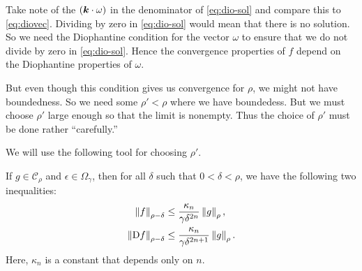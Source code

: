 \documentclass[twoside,letterpaper,10pt]{article}
\numberwithin{equation}{section}
\begin{document}
Take note of the $(\bm{k} \cdot \omega)$ in the denominator of \cref{eq:dio-sol}
and compare this to \cref{eq:diovec}.
Dividing by zero in \cref{eq:dio-sol} would mean that there is no solution.
So we need the Diophantine condition for the vector $\omega$ to ensure that we
do not divide by zero in \cref{eq:dio-sol}.
Hence the convergence properties of $f$ depend on the Diophantine properties of
$\omega$.

But even though this condition gives us convergence for $\rho$, we might not
have boundedness.
So we need some $\rho' < \rho$ where we have boundedess.
But we must choose $\rho'$ large enough so that the limit is nonempty.
Thus the choice of $\rho'$ must be done rather ``carefully.''

We will use the following tool for choosing $\rho'$.
\begin{prop}
  If $g \in \mathcal{C}_{\rho}$ and $\epsilon \in \Omega_{\gamma}$, then for all
  $\delta$ such that $0 < \delta < \rho$, we have the following two
  inequalities:
  \begin{align*}
    \norm{f}_{\rho - \delta} &\leq \frac{\kappa_n}{\gamma
                               \delta^{2n}}\norm{g}_{\rho},\\
    \norm{\Dif f}_{\rho - \delta} &\leq \frac{\kappa_n}{\gamma \delta^{2n + 1}}
                    \norm{g}_{\rho}.
  \end{align*}
  Here, $\kappa_n$ is a constant that depends only on $n$.
\end{prop}
\end{document}

